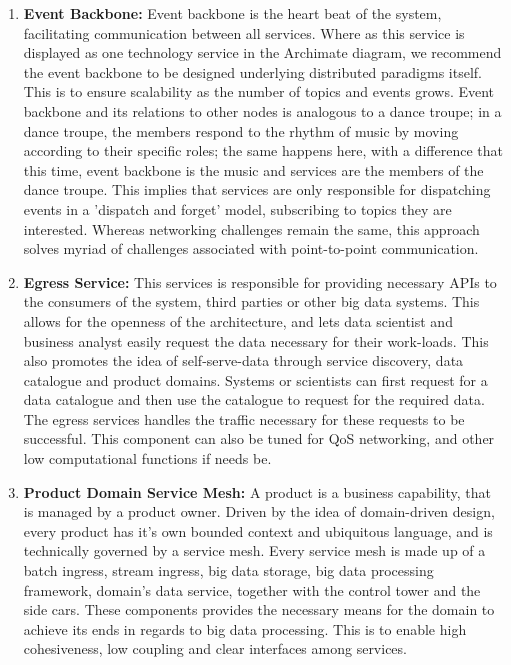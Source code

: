 \documentclass[runningheads]{llncs}
\begin{document}
\begin{enumerate}
    \item \textbf{Event Backbone:} Event backbone is the heart beat of the system, facilitating communication between all services. Where as this service is displayed as one technology service in the Archimate diagram, we recommend the event backbone to be designed underlying distributed paradigms itself. This is to ensure scalability as the number of topics and events grows. Event backbone and its relations to other nodes is analogous to a dance troupe; in a dance troupe, the members respond to the rhythm of music by moving according to their specific roles; the same happens here, with a difference that this time, event backbone is the music and services are the members of the dance troupe. This implies that services are only responsible for dispatching events in a 'dispatch and forget' model, subscribing to topics they are interested. Whereas networking challenges remain the same, this approach solves myriad of challenges associated with point-to-point communication.
    \item \textbf{Egress Service:} This services is responsible for providing necessary APIs to the consumers of the system, third parties or other big data systems. This allows for the openness of the architecture, and lets data scientist and business analyst easily request the data necessary for their work-loads. This also promotes the idea of self-serve-data through service discovery, data catalogue and product domains. Systems or scientists can first request for a data catalogue and then use the catalogue to request for the required data. The egress services handles the traffic necessary for these requests to be successful. This component can also be tuned for QoS networking, and other low computational functions if needs be. 
    \item \textbf{Product Domain Service Mesh:} A product is a business capability, that is managed by a product owner. Driven by the idea of domain-driven design, every product has it's own bounded context and ubiquitous language, and is technically governed by a service mesh. Every service mesh is made up of a batch ingress, stream ingress, big data storage, big data processing framework, domain's data service, together with the control tower and the side cars. These components provides the necessary means for the domain to achieve its ends in regards to big data processing. This is to enable high cohesiveness, low coupling and clear interfaces among services. 

\end{enumerate}
\end{document}
